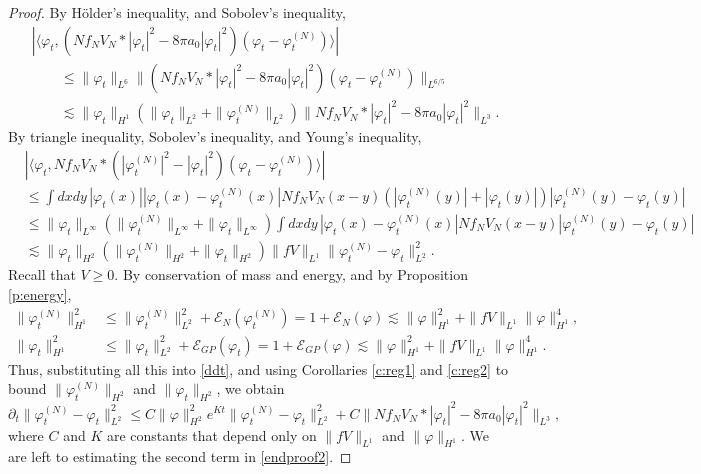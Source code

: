\documentclass[11pt,a4paper]{scrartcl} %
\begin{document}
\begin{proof}
  By H\"older's inequality, and Sobolev's inequality,
  \begin{align*}
    & |\langle \varphi_t, (N f_N V_N * |\varphi_t|^2 - 8 \pi a_0
    |\varphi_t|^2) (\varphi_t - \varphi_t^{(N)}) \rangle| \\
    & \qquad \le \| \varphi_t \|_{L^6} \| (N f_N V_N * |\varphi_t|^2 - 8 \pi
    a_0 |\varphi_t|^2) (\varphi_t - \varphi_t^{(N)}) \|_{L^{6/5}} \\
    & \qquad \apprle \| \varphi_t \|_{H^1} (\| \varphi_t \|_{L^2} + \|
    \varphi_t^{(N)} \|_{L^2}) \| N f_N V_N * |\varphi_t|^2 - 8 \pi a_0
    |\varphi_t|^2 \|_{L^3}.
  \end{align*}
  By triangle inequality, Sobolev's inequality, and Young's inequality,
  \begin{align*}
    & |\langle \varphi_t, N f_N V_N * (|\varphi_t^{(N)}|^2 - |\varphi_t|^2)
    (\varphi_t - \varphi_t^{(N)}) \rangle| \\
    & \le \int dx dy \, |\varphi_t(x)| |\varphi_t(x) - \varphi_t^{(N)}(x)| N
    f_N V_N(x-y) (|\varphi_t^{(N)}(y)| + |\varphi_t(y)|) |\varphi_t^{(N)}(y) -
    \varphi_t(y)| \\
    & \le \| \varphi_t \|_{L^\infty} ( \| \varphi_t^{(N)} \|_{L^\infty} + \|
    \varphi_t \|_{L^\infty} ) \int dx dy \, |\varphi_t(x) -
    \varphi_t^{(N)}(x)| N f_N V_N(x-y) |\varphi_t^{(N)}(y) - \varphi_t(y)| \\
    & \apprle \| \varphi_t \|_{H^2} ( \| \varphi_t^{(N)} \|_{H^2} + \|
    \varphi_t \|_{H^2} ) \| fV \|_{L^1} \| \varphi_t^{(N)} - \varphi_t
    \|_{L^2}^2.
  \end{align*}
  Recall that $V \ge 0$. By conservation of mass and energy, and by
  Proposition \ref{p:energy},
  \begin{align*}
    \| \varphi_t^{(N)} \|_{H^1}^2 & \le \| \varphi_t^{(N)} \|_{L^2}^2 +
    \mathcal{E}_N(\varphi_t^{(N)}) = 1 + \mathcal{E}_N(\varphi) \apprle \|
    \varphi \|_{H^1}^2 + \| fV \|_{L^1} \| \varphi \|_{H^1}^4, \\
    \| \varphi_t \|_{H^1}^2 & \le \| \varphi_t \|_{L^2}^2 +
    \mathcal{E}_{GP}(\varphi_t) = 1 + \mathcal{E}_{GP}(\varphi) \apprle \|
    \varphi \|_{H^1}^2 + \| fV \|_{L^1} \| \varphi \|_{H^1}^4.
  \end{align*}
  Thus, substituting all this into \eqref{ddt}, and using Corollaries
  \ref{c:reg1} and \ref{c:reg2} to bound $\| \varphi_t^{(N)} \|_{H^2}$ and $\|
  \varphi_t \|_{H^2}$, we obtain
  \begin{equation}
    \label{endproof2}
    \partial_t \| \varphi_t^{(N)} - \varphi_t \|_{L^2}^2 \le C \| \varphi
    \|_{H^2}^2 e^{Kt} \| \varphi_t^{(N)} - \varphi_t \|_{L^2}^2 + C \| N f_N
    V_N * |\varphi_t|^2 - 8 \pi a_0 |\varphi_t|^2 \|_{L^3},
  \end{equation}
  where $C$ and $K$ are constants that depend only on $\| fV \|_{L^1}$ and $\|
  \varphi \|_{H^1}$. We are left to estimating the second term in
  \eqref{endproof2}.



\end{proof}
\end{document}
